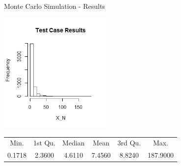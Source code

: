 \begin{frame}{Monte Carlo Simulation - Results}

\begin{center}
\includegraphics[width=5.5cm]{img/MilTestCase}
\end{center}

\begin{tabular}{cccccc}
    Min. & 1st Qu. &  Median  &   Mean & 3rd Qu.  &   Max.\\ 
  0.1718  & 2.3600 &  4.6110 &  7.4560 &  8.8240 & 187.9000
\end{tabular}
 

\end{frame}


